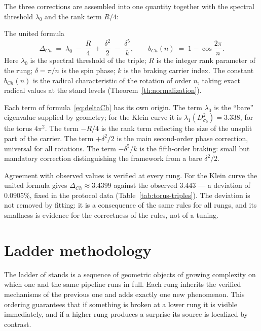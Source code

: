 The three corrections are assembled into one quantity together with
the spectral threshold $\lambda_0$ and the rank term $R/4$:
\begin{keybox}{The united formula}
\begin{equation}\label{eq:deltaCh}
  \Delta_{Ch} \;=\; \lambda_0 \;-\; \frac{R}{4}
  \;+\; \frac{\delta^2}{2} \;-\; \frac{\delta^5}{k},
  \qquad
  b_{Ch}(n) \;=\; 1-\cos\frac{2\pi}{n}.
\end{equation}
Here $\lambda_0$ is the spectral threshold of the triple; $R$ is the
integer rank parameter of the rung; $\delta=\pi/n$ is the spin
phase; $k$ is the braking carrier index. The constant $b_{Ch}(n)$
is the radical characteristic of the rotation of order $n$, taking
exact radical values at the stand levels
(Theorem~\ref{th:normalization}).
\end{keybox}

Each term of formula~\eqref{eq:deltaCh} has its own origin. The term
$\lambda_0$ is the ``bare'' eigenvalue supplied by geometry; for the
Klein curve it is $\lambda_1(D^2_{\sigma_0})=3.338$, for the torus
$4\pi^2$. The term $-R/4$ is the rank term reflecting the size of
the unsplit part of the carrier. The term $+\delta^2/2$ is the main
second-order phase correction, universal for all rotations. The term
$-\delta^5/k$ is the fifth-order braking: small but mandatory
correction distinguishing the framework from a bare $\delta^2/2$.

Agreement with observed values is verified at every rung. For the
Klein curve the united formula gives $\Delta_{Ch}\approx3.4399$
against the observed $3.443$ --- a deviation of $0.0905\%$, fixed in
the protocol data (Table~\ref{tab:torus-triples}). The deviation is
not removed by fitting: it is a consequence of the same rules for
all rungs, and its smallness is evidence for the correctness of the
rules, not of a tuning.

\section{Ladder methodology}\label{sec:ladder}

The ladder of stands is a sequence of geometric objects of growing
complexity on which one and the same pipeline runs in full. Each
rung inherits the verified mechanisms of the previous one and adds
exactly one new phenomenon. This ordering guarantees that if
something is broken at a lower rung it is visible immediately, and
if a higher rung produces a surprise its source is localized by
contrast.


